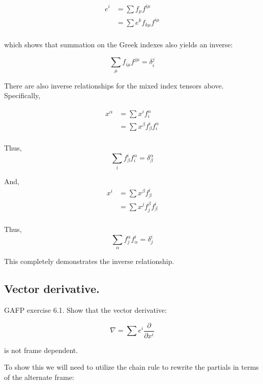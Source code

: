 \begin{align*}
e^i
&= \sum f_{\mu} f^{i \mu}  \\
&= \sum e^k f_{k\mu} f^{i \mu} \\
\end{align*}

which shows that summation on the Greek indexes also yields an inverse:

\begin{equation}
\sum_{\mu} f_{i\mu} f^{j \mu} = \delta_{i}^j
\end{equation}

There are also inverse relationships for the mixed index tensors above.  Specifically, 

\begin{align*}
x^{\alpha} 
&= \sum x^i f_i^{\alpha} \\
&= \sum x^{\beta} f_{\beta}^i f_i^{\alpha} \\
\end{align*}

Thus,
\begin{equation}
\sum_i f_{\beta}^i f_i^{\alpha} = \delta_{\beta}^{\alpha}
\end{equation}

And,
\begin{align*}
x^{i} 
&= \sum x^{\beta} f_{\beta}^i \\
&= \sum x^{j} f_j^{\beta} f_{\beta}^i \\
\end{align*}

Thus,
\begin{equation}
\sum_{\alpha} f_j^{\alpha} f_{\alpha}^i = \delta_j^i
\end{equation}

This completely demonstrates the inverse relationship.

\subsection{Vector derivative.}

GAFP exercise 6.1.  Show that the vector derivative:

\begin{equation}
\nabla = \sum e^i \frac{\partial}{\partial x^i}
\end{equation}

is not frame dependent.

To show this we will need to utilize the chain rule to rewrite the partials in terms of the alternate frame:

